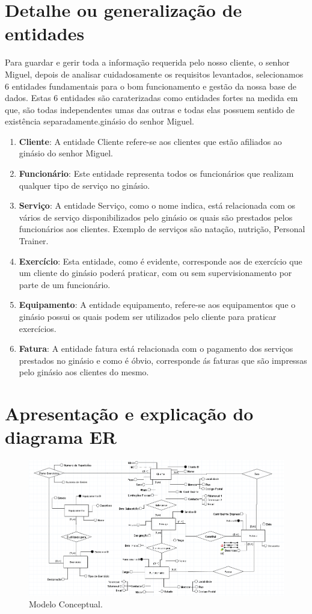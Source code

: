 \section{Detalhe ou generalização de entidades}
Para guardar e gerir toda a informação requerida pelo nosso cliente, o senhor Miguel, depois de analisar cuidadosamente os requisitos levantados, selecionamos 6 entidades fundamentais para o bom funcionamento e gestão da nossa base de dados. Estas 6 entidades são caraterizadas como entidades fortes na medida em que, são todas independentes umas das outras e todas elas possuem sentido de existência separadamente.ginásio do senhor Miguel.


\begin{enumerate}
\item \textbf{Cliente}:  A entidade Cliente refere-se aos clientes que estão afiliados ao ginásio do senhor Miguel.
\item \textbf{Funcionário}: Este entidade representa todos os funcionários que realizam qualquer tipo de serviço no ginásio.
\item \textbf{Serviço}: A entidade Serviço, como o nome indica, está relacionada com os vários de serviço disponibilizados pelo ginásio os quais são prestados pelos funcionários aos clientes. Exemplo de serviços são natação, nutrição, Personal Trainer.
\item \textbf{Exercício}: Esta entidade, como é evidente, corresponde aos de exercício que um cliente do ginásio poderá praticar, com ou sem supervisionamento por parte de um funcionário.
\item \textbf{Equipamento}: A entidade equipamento, refere-se aos equipamentos que o ginásio possui os quais podem ser utilizados pelo cliente para praticar exercícios.
\item \textbf{Fatura}: A entidade fatura está relacionada com o pagamento dos serviços prestados no ginásio e como é óbvio, corresponde ás faturas que são impressas pelo ginásio aos clientes do mesmo.
\end{enumerate}


\section{Apresentação e explicação do diagrama ER}
\begin{figure}[h]
\includegraphics[width=\textwidth]{Conceptual/Conceptual10.png}
\caption{Modelo Conceptual.}
\label{fig:concetual}
\end{figure}

